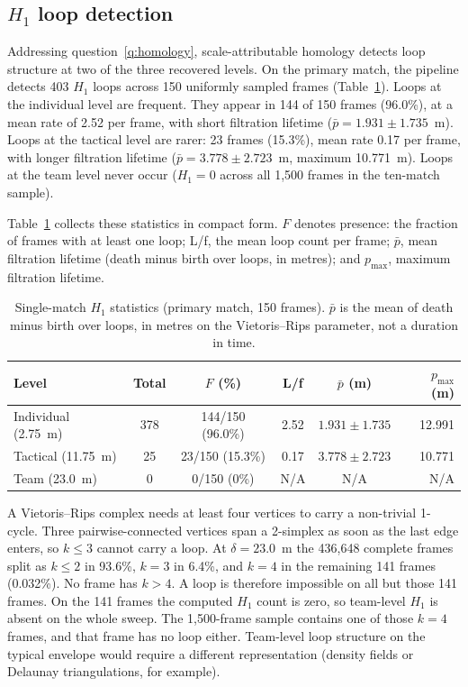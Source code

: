 \subsection{\texorpdfstring{$H_1$}{} loop detection}
\label{sec:h1detection}

Addressing question~\ref{q:homology}, scale-attributable homology
detects loop structure at two of the three recovered levels. On
the primary match, the pipeline detects 403 $H_1$ loops across 150
uniformly sampled frames (Table~\ref{tab:h1single}). Loops at the
individual level are frequent. They appear in 144 of 150 frames
(96.0\%), at a mean rate of 2.52 per frame, with short filtration
lifetime ($\bar{p}=1.931 \pm 1.735$~m). Loops at the tactical level are
rarer: 23 frames (15.3\%), mean rate 0.17 per frame, with longer
filtration lifetime ($\bar{p}=3.778 \pm 2.723$~m, maximum 10.771~m).
Loops at the team level never occur ($H_1 = 0$ across all 1{,}500
frames in the ten-match sample).

Table~\ref{tab:h1single} collects these statistics in compact form.
$F$ denotes presence: the fraction of frames with at least one loop;
L/f, the mean loop count per frame; $\bar{p}$, mean filtration
lifetime (death minus birth over loops, in metres); and $p_{\max}$,
maximum filtration lifetime.

\begin{table}[h]
\centering
\caption{Single-match \texorpdfstring{$H_1$}{} statistics (primary match, 150 frames).
$\bar{p}$ is the mean of death minus birth over loops, in metres on the
Vietoris--Rips parameter, not a duration in time.}
\label{tab:h1single}
\begin{tabular}{@{}lccccr@{}}
\toprule
Level & Total & $F$ (\%) & L/f & $\bar{p}$ (m) & $p_{\max}$ (m) \\
\midrule
Individual (2.75~m) & 378 & 144/150 (96.0\%) & 2.52 & $1.931\pm1.735$ & 12.991 \\
Tactical (11.75~m)  & 25  & 23/150 (15.3\%)  & 0.17 & $3.778\pm2.723$ & 10.771 \\
Team (23.0~m)       & 0   & 0/150 (0\%)      & N/A  & N/A             & N/A \\
\bottomrule
\end{tabular}
\end{table}

\begin{remark}
\label{rem:teamnull}
A Vietoris--Rips complex needs at least four vertices to carry a
non-trivial 1-cycle. Three pairwise-connected vertices span a
2-simplex as soon as the last edge enters, so $k\le 3$ cannot carry a
loop. At $\delta = 23.0$~m the 436{,}648 complete frames split as
$k\le 2$ in 93.6\%, $k=3$ in 6.4\%, and $k=4$ in the remaining 141
frames (0.032\%). No frame has $k>4$. A loop is therefore impossible
on all but those 141 frames. On the 141 frames the computed $H_1$
count is zero, so team-level $H_1$ is absent on the whole sweep.
The 1{,}500-frame sample contains one of those $k=4$ frames, and that
frame has no loop either. Team-level loop structure on the typical
envelope would require a different representation (density fields or
Delaunay triangulations, for example).
\end{remark}

